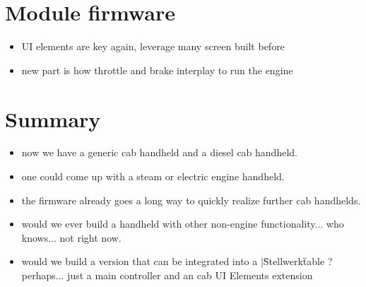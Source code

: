 \section{Module firmware}

\begin{itemize}
\item UI elements are key again, leverage many screen built before
\item new part is how throttle and brake interplay to run the engine
\end{itemize}


\section{Summary}

\begin{itemize}
\item now we have a generic cab handheld and a diesel cab handheld.
\item one could come up with a steam or electric engine handheld. 
\item the firmware already goes a long way to quickly realize further cab handhelds.
\item would we ever build a handheld with other non-engine functionality... who knows... not right now.
\item would we build a version that can be integrated into a |\"Stellwerk\" table ? perhaps... just a main controller and an cab UI Elements extension
\end{itemize}
